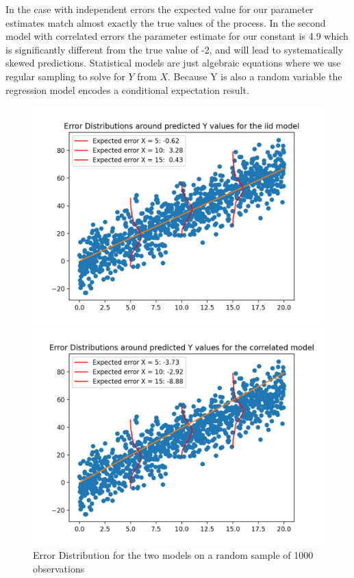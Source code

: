 \documentclass{tufte-handout}
\begin{document}
\noindent In the case with independent errors the expected value for our parameter estimates match almost exactly the true values of the process. In the second model with correlated errors the parameter estimate for our constant is 4.9 which is significantly different from the true value of -2, and will lead to systematically skewed predictions. Statistical models are just algebraic equations where we use regular sampling to solve for $Y$ from $X$. Because Y is also a random variable the regression model encodes a conditional expectation result.

\begin{figure}
\begin{multicols}{2}
      \includegraphics[width=\linewidth]{../Expectation/Plots/errors_dist_iid.png}\par 
    \includegraphics[width=\linewidth]{../Expectation/Plots/correlated_errors_dist.png}\par 
    \end{multicols}
  \caption{Error Distribution for the two models on a random sample of 1000 observations}
\end{figure}
\end{document}
